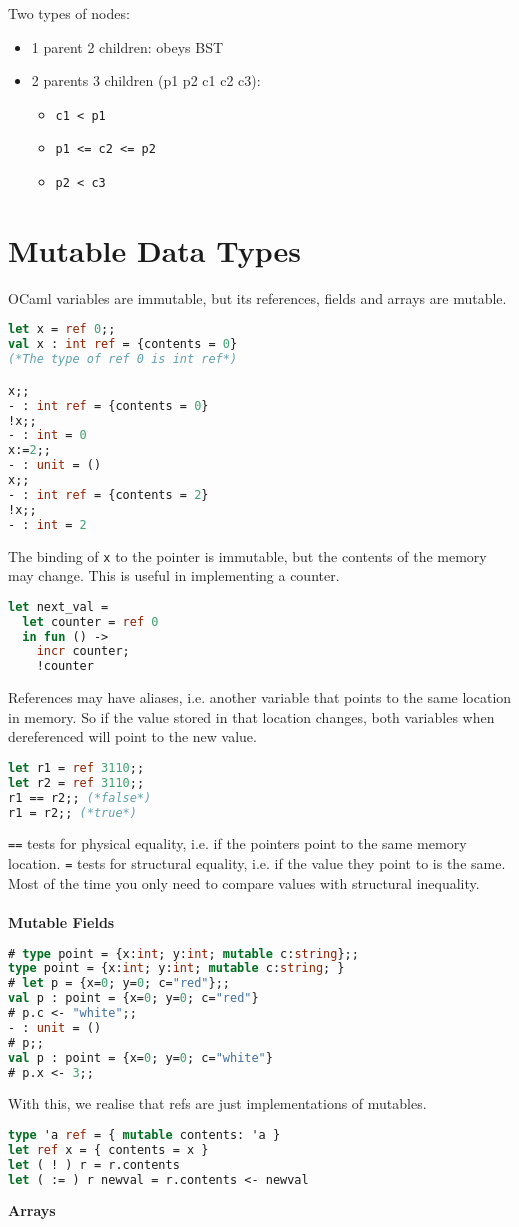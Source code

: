 \documentclass[12pt,a4paper]{article} %
\begin{document}
Two types of nodes:
	\begin{itemize}
	\item 1 parent 2 children: obeys BST
	\item 2 parents 3 children (p1 p2 c1 c2 c3):
		\begin{itemize}
		\item \verb|c1 < p1|
		\item \verb|p1 <= c2 <= p2|
		\item \verb|p2 < c3|
		\end{itemize}
	\end{itemize}
\section{Mutable Data Types}
OCaml variables are immutable, but its references, fields and arrays are mutable.
\begin{lstlisting}[language=Caml]
let x = ref 0;;
val x : int ref = {contents = 0}
(*The type of ref 0 is int ref*)

x;;
- : int ref = {contents = 0}
!x;;
- : int = 0
x:=2;;
- : unit = ()
x;;
- : int ref = {contents = 2}
!x;;
- : int = 2
\end{lstlisting}
The binding of \verb|x| to the pointer is immutable, but the contents of the memory may change. This is useful in implementing a counter.
\begin{lstlisting}[language=Caml]
let next_val =
  let counter = ref 0
  in fun () ->
    incr counter;
    !counter
\end{lstlisting}
References may have aliases, i.e. another variable that points to the same location in memory. So if the value stored in that location changes, both variables when dereferenced will point to the new value.
\begin{lstlisting}[language=Caml]
let r1 = ref 3110;;
let r2 = ref 3110;;
r1 == r2;; (*false*)
r1 = r2;; (*true*)
\end{lstlisting}
\verb|==| tests for physical equality, i.e. if the pointers point to the same memory location. \verb|=| tests for structural equality, i.e. if the value they point to is the same. Most of the time you only need to compare values with structural inequality. 
\\\\
\textbf{Mutable Fields}
\begin{lstlisting}[language=Caml]
# type point = {x:int; y:int; mutable c:string};;
type point = {x:int; y:int; mutable c:string; }
# let p = {x=0; y=0; c="red"};;
val p : point = {x=0; y=0; c="red"}
# p.c <- "white";;
- : unit = ()
# p;;
val p : point = {x=0; y=0; c="white"}
# p.x <- 3;;
\end{lstlisting}
With this, we realise that refs are just implementations of mutables.
\begin{lstlisting}[language=Caml]
type 'a ref = { mutable contents: 'a }
let ref x = { contents = x }
let ( ! ) r = r.contents
let ( := ) r newval = r.contents <- newval
\end{lstlisting}
\textbf{Arrays}
\end{document}
